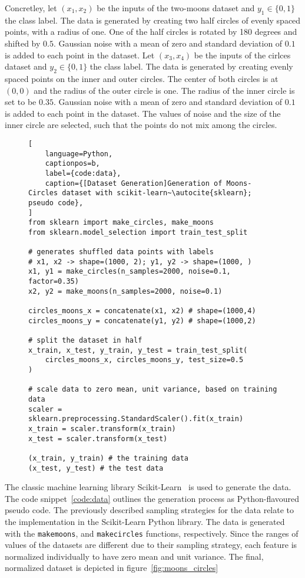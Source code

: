 Concretley, let $( x_1 , x_2 )$ be the inputs of the two-moons dataset and $y_1 \in \{0,1\}$ the class label.
The data is generated by creating two half circles of evenly spaced points, with a radius of one.
One of the half circles is rotated by 180 degrees and shifted by $0.5$.
Gaussian noise with a mean of zero and standard deviation of $0.1$ is added to each point in the dataset.
Let $( x_3 , x_4 )$ be the inputs of the cirlces dataset and $y_2 \in \{0,1\}$ the class label.
The data is generated by creating evenly spaced points on the inner and outer circles. 
The center of both circles is at $(0,0)$ and the radius of the outer circle is one.
The radius of the inner circle is set to be $0.35$.
Gaussian noise with a mean of zero and standard deviation of $0.1$ is added to each point in the dataset.
The values of noise and the size of the inner circle are selected, such that the points do not mix among the circles.

\begin{figure}[ht]
\centering
\begin{minipage}{\linewidth}
\begin{lstlisting}[
    language=Python,
    captionpos=b, 
    label={code:data},
    caption={[Dataset Generation]Generation of Moons-Circles dataset with scikit-learn~\autocite{sklearn}; pseudo code},
]
from sklearn import make_circles, make_moons
from sklearn.model_selection import train_test_split

# generates shuffled data points with labels
# x1, x2 -> shape=(1000, 2); y1, y2 -> shape=(1000, ) 
x1, y1 = make_circles(n_samples=2000, noise=0.1, factor=0.35)
x2, y2 = make_moons(n_samples=2000, noise=0.1)

circles_moons_x = concatenate(x1, x2) # shape=(1000,4)
circles_moons_y = concatenate(y1, y2) # shape=(1000,2)

# split the dataset in half
x_train, x_test, y_train, y_test = train_test_split(
    circles_moons_x, circles_moons_y, test_size=0.5
)

# scale data to zero mean, unit variance, based on training data
scaler = sklearn.preprocessing.StandardScaler().fit(x_train)
x_train = scaler.transform(x_train)
x_test = scaler.transform(x_test)

(x_train, y_train) # the training data
(x_test, y_test) # the test data
\end{lstlisting}
\end{minipage}
\end{figure}

The classic machine learning library Scikit-Learn~\autocite{sklearn} is used to generate the data. 
The code snippet~\ref{code:data} outlines the generation process as Python-flavoured pseudo code.
The previously described sampling strategies for the data relate to the implementation in the Scikit-Learn Python library.
The data is generated with the \lstinline{makemoons}, and \lstinline{makecircles} functions, respectively.
Since the ranges of values of the datasets are different due to their sampling strategy, each feature is normalized individually to have zero mean and unit variance.
The final, normalized dataset is depicted in figure~\ref{fig:moons_circles}

